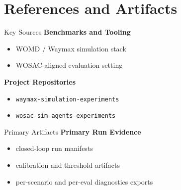 \section{References and Artifacts}

\begin{frame}{Key Sources}
\small
\textbf{Benchmarks and Tooling}
\begin{itemize}
    \item WOMD / Waymax simulation stack
    \item WOSAC-aligned evaluation setting
\end{itemize}
\vspace{0.1em}
\textbf{Project Repositories}
\begin{itemize}
    \item \texttt{waymax-simulation-experiments}
    \item \texttt{wosac-sim-agents-experiments}
\end{itemize}
\end{frame}

\begin{frame}{Primary Artifacts}
\small
\textbf{Primary Run Evidence}
\begin{itemize}
    \item closed-loop run manifests
    \item calibration and threshold artifacts
    \item per-scenario and per-eval diagnostics exports
\end{itemize}
\end{frame}
